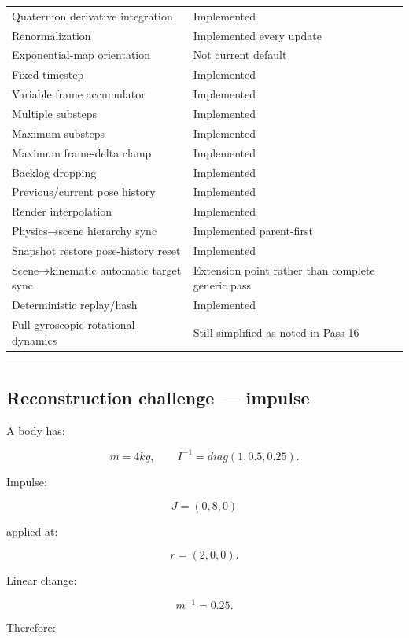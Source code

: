 {\begin{longtable}[]{@{}
  >{\raggedright\arraybackslash}p{}
  >{\raggedright\arraybackslash}p{}@{}}
Quaternion derivative integration & Implemented \\
Renormalization & Implemented every update \\
Exponential-map orientation & Not current default \\
Fixed timestep & Implemented \\
Variable frame accumulator & Implemented \\
Multiple substeps & Implemented \\
Maximum substeps & Implemented \\
Maximum frame-delta clamp & Implemented \\
Backlog dropping & Implemented \\
Previous/current pose history & Implemented \\
Render interpolation & Implemented \\
Physics→scene hierarchy sync & Implemented parent-first \\
Snapshot restore pose-history reset & Implemented \\
Scene→kinematic automatic target sync & Extension point rather than complete generic pass \\
Deterministic replay/hash & Implemented \\
Full gyroscopic rotational dynamics & Still simplified as noted in Pass 16 \\
\end{longtable}
}

\begin{center}\rule{0.5\linewidth}{0.5pt}\end{center}

\subsection{Reconstruction challenge --- impulse}\label{06-engine-ii-ch038-reconstruction-challenge-impulse}

\hypertarget{06-engine-ii-ch038-reconstruction-challenge-impulse}{}

A body has:

\[
m=4kg,
\qquad
I^{-1}
=
diag(1,0.5,0.25).
\]

Impulse:

\[
J=(0,8,0)
\]

applied at:

\[
r=(2,0,0).
\]

Linear change:

\[
m^{-1}=0.25.
\]

Therefore:

